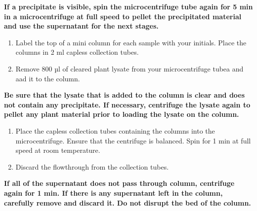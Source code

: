 \documentclass[]{book}
\providecommand{\tightlist}{%
  \setlength{\itemsep}{0pt}\setlength{\parskip}{0pt}}
\theoremstyle{definition}
\theoremstyle{definition}
\theoremstyle{definition}
\theoremstyle{remark}
\let\BeginKnitrBlock\begin \let\EndKnitrBlock\end
\begin{document}
\BeginKnitrBlock{rmdimportant}
\textbf{If a precipitate is visible, spin the microcentrifuge tube again
for 5 min in a microcentrifuge at full speed to pellet the precipitated
material and use the supernatant for the next stages.}
\EndKnitrBlock{rmdimportant}

\begin{enumerate}
\def\labelenumi{\arabic{enumi}.}
\setcounter{enumi}{9}
\tightlist
\item
  Label the top of a mini column for each sample with your initials.
  Place the columns in 2 ml capless collection tubes.
\item
  Remove 800 µl of cleared plant lysate from your microcentrifuge tubea
  and aad it to the column.
\end{enumerate}

\BeginKnitrBlock{rmdimportant}
\textbf{Be sure that the lysate that is added to the column is clear and
does not contain any precipitate. If necessary, centrifuge the lysate
again to pellet any plant material prior to loading the lysate on the
column.}
\EndKnitrBlock{rmdimportant}

\begin{enumerate}
\def\labelenumi{\arabic{enumi}.}
\setcounter{enumi}{11}
\tightlist
\item
  Place the capless collection tubes containing the columns into the
  microcentrifuge. Ensure that the centrifuge is balanced. Spin for 1
  min at full speed at room temperature.
\item
  Discard the flowthrough from the collection tubes.
\end{enumerate}

\BeginKnitrBlock{rmdimportant}
\textbf{If all of the supernatant does not pass through column,
centrifuge again for 1 min. If there is any supernatant left in the
column, carefully remove and discard it. Do not disrupt the bed of the
column.}
\EndKnitrBlock{rmdimportant}
\end{document}
